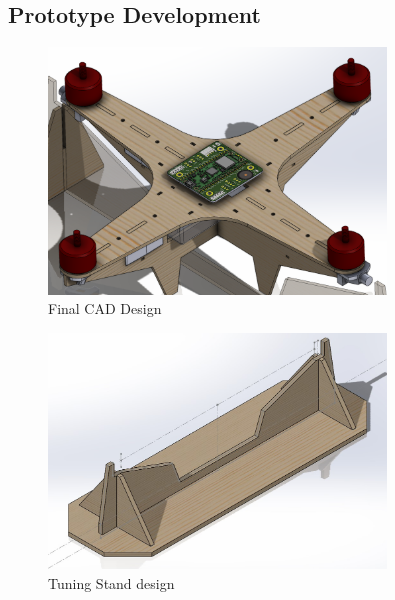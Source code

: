 \documentclass{article}
\begin{document}
\subsection{Prototype Development}

\begin{figure}[H]
    \centering
    \includegraphics[width=0.8\textwidth]{progress_cad.png}
    \caption{Final CAD Design}
\end{figure}

\begin{figure}[H]
    \centering
    \includegraphics[width=0.8\textwidth]{tuning_stand.jpg}
    \caption{Tuning Stand design}
\end{figure}
\end{document}
